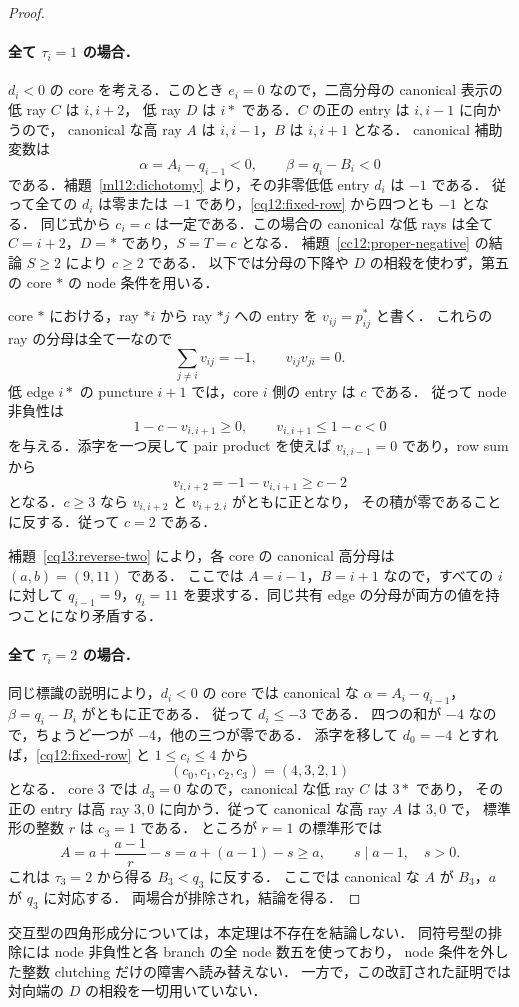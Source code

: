 \begin{proof}
\paragraph{全て $\tau_i=1$ の場合．}
$d_i<0$ の core を考える．このとき $e_i=0$ なので，二高分母の canonical 表示の低 ray $C$ は $i,i+2$，
低 ray $D$ は $i*$ である．$C$ の正の entry は $i,i-1$ に向かうので，
canonical な高 ray $A$ は $i,i-1$，$B$ は $i,i+1$ となる．
canonical 補助変数は
\[
 \alpha=A_i-q_{i-1}<0,\qquad
 \beta=q_i-B_i<0
\]
である．補題~\ref{ml12:dichotomy} より，その非零低低 entry $d_i$ は $-1$ である．
従って全ての $d_i$ は零または $-1$ であり，\eqref{cq12:fixed-row} から四つとも $-1$ となる．
同じ式から $c_i=c$ は一定である．この場合の canonical な低 rays は全て
$C=i+2$，$D=*$ であり，$S=T=c$ となる．
補題~\ref{cc12:proper-negative} の結論 $S\geq2$ により $c\geq2$ である．
以下では分母の下降や $D$ の相殺を使わず，第五の core $*$ の node 条件を用いる．

core $*$ における，ray $*i$ から ray $*j$ への entry を $v_{ij}=p^*_{ij}$ と書く．
これらの ray の分母は全て一なので
\[
 \sum_{j\ne i}v_{ij}=-1,\qquad v_{ij}v_{ji}=0.
\]
低 edge $i*$ の puncture $i+1$ では，core $i$ 側の entry は $c$ である．
従って node 非負性は
\[
 1-c-v_{i,i+1}\geq0,\qquad v_{i,i+1}\leq1-c<0
\]
を与える．添字を一つ戻して pair product を使えば $v_{i,i-1}=0$ であり，row sum から
\[
 v_{i,i+2}=-1-v_{i,i+1}\geq c-2
\]
となる．$c\geq3$ なら $v_{i,i+2}$ と $v_{i+2,i}$ がともに正となり，
その積が零であることに反する．従って $c=2$ である．

補題~\ref{cq13:reverse-two} により，各 core の canonical 高分母は $(a,b)=(9,11)$ である．
ここでは $A=i-1$，$B=i+1$ なので，すべての $i$ に対して
$q_{i-1}=9$，$q_i=11$ を要求する．同じ共有 edge の分母が両方の値を持つことになり矛盾する．

\paragraph{全て $\tau_i=2$ の場合．}
同じ標識の説明により，$d_i<0$ の core では canonical な
$\alpha=A_i-q_{i-1}$，$\beta=q_i-B_i$ がともに正である．
従って $d_i\leq-3$ である．
四つの和が $-4$ なので，ちょうど一つが $-4$，他の三つが零である．
添字を移して $d_0=-4$ とすれば，\eqref{cq12:fixed-row} と $1\leq c_i\leq4$ から
\[
 (c_0,c_1,c_2,c_3)=(4,3,2,1)
\]
となる．
core $3$ では $d_3=0$ なので，canonical な低 ray $C$ は $3*$ であり，
その正の entry は高 ray $3,0$ に向かう．従って canonical な高 ray $A$ は $3,0$ で，
標準形の整数 $r$ は $c_3=1$ である．
ところが $r=1$ の標準形では
\[
 A=a+\frac{a-1}{r}-s=a+(a-1)-s\geq a,
 \qquad s\mid a-1,\quad s>0.
\]
これは $\tau_3=2$ から得る $B_3<q_3$ に反する．
ここでは canonical な $A$ が $B_3$，$a$ が $q_3$ に対応する．
両場合が排除され，結論を得る．
\end{proof}

交互型の四角形成分については，本定理は不存在を結論しない．
同符号型の排除には node 非負性と各 branch の全 node 数五を使っており，
node 条件を外した整数 clutching だけの障害へ読み替えない．
一方で，この改訂された証明では対向端の $D$ の相殺を一切用いていない．
